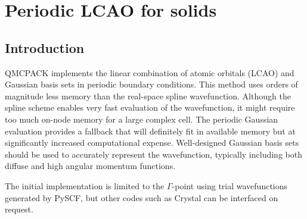 \chapter{Periodic LCAO for solids}
\label{chap:LCAO}

\section{Introduction}

QMCPACK implements the linear combination of atomic orbitals (LCAO) and Gaussian
basis sets in periodic boundary conditions. This method uses orders of
magnitude less memory than the real-space spline wavefunction. Although
the spline scheme enables very fast evaluation of the wavefunction, it might
require too much on-node memory for a large complex cell. The periodic
Gaussian evaluation provides a fallback that will definitely fit in
available memory but at significantly increased computational
expense. Well-designed Gaussian basis sets should be used to accurately
represent the wavefunction, typically
including both diffuse and high angular momentum functions.

The initial implementation is limited to the $\Gamma$-point using
trial wavefunctions generated by PySCF\cite{Sun2018}, but other codes such as
Crystal can be interfaced on request.


